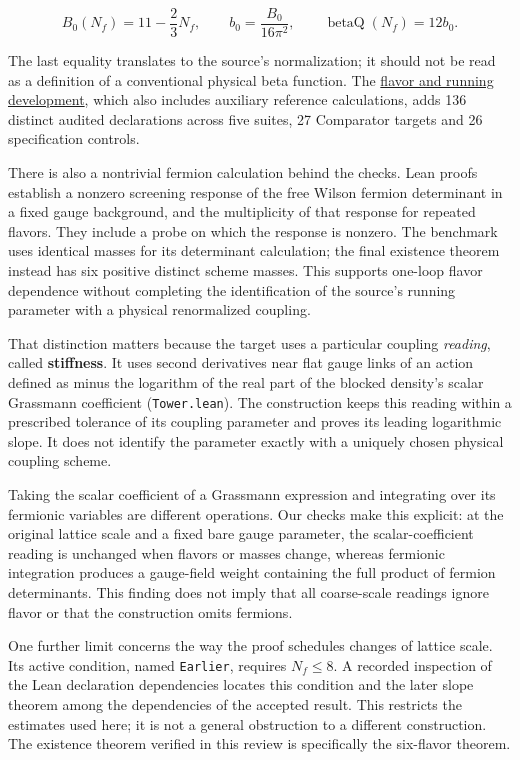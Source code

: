 \documentclass[
  11pt,
]{article}
\begin{document}
\[
B_0(N_f)=11-\frac{2}{3}N_f,\qquad
b_0=\frac{B_0}{16\pi^2},\qquad
\operatorname{betaQ}(N_f)=12b_0.
\]

The last equality translates to the source's normalization; it should
not be read as a definition of a conventional physical beta function.
The
\href{https://github.com/yang-mills-group/QCD/blob/main/docs/flavor-running-tests.md}{flavor
and running development}, which also includes auxiliary reference
calculations, adds 136 distinct audited declarations across five suites,
27 Comparator targets and 26 specification controls.

There is also a nontrivial fermion calculation behind the checks. Lean
proofs establish a nonzero screening response of the free Wilson fermion
determinant in a fixed gauge background, and the multiplicity of that
response for repeated flavors. They include a probe on which the
response is nonzero. The benchmark uses identical masses for its
determinant calculation; the final existence theorem instead has six
positive distinct scheme masses. This supports one-loop flavor
dependence without completing the identification of the source's running
parameter with a physical renormalized coupling.

That distinction matters because the target uses a particular coupling
\emph{reading}, called \textbf{stiffness}. It uses second derivatives
near flat gauge links of an action defined as minus the logarithm of the
real part of the blocked density's scalar Grassmann coefficient
({\small \nolinkurl{Tower.lean}}). The construction keeps this reading
within a prescribed tolerance of its coupling parameter and proves its
leading logarithmic slope. It does not identify the parameter exactly
with a uniquely chosen physical coupling scheme.

Taking the scalar coefficient of a Grassmann expression and integrating
over its fermionic variables are different operations. Our checks make
this explicit: at the original lattice scale and a fixed bare gauge
parameter, the scalar-coefficient reading is unchanged when flavors or
masses change, whereas fermionic integration produces a gauge-field
weight containing the full product of fermion determinants. This finding
does not imply that all coarse-scale readings ignore flavor or that the
construction omits fermions.

One further limit concerns the way the proof schedules changes of
lattice scale. Its active condition, named {\small \nolinkurl{Earlier}},
requires \(N_f\leq8\). A recorded inspection of the Lean declaration
dependencies locates this condition and the later slope theorem among
the dependencies of the accepted result. This restricts the estimates
used here; it is not a general obstruction to a different construction.
The existence theorem verified in this review is specifically the
six-flavor theorem.
\end{document}
